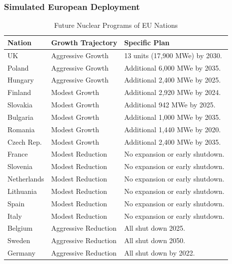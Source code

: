 \begin{frame}
	\frametitle{Simulated European Deployment}
	
\begin{table}[h]
	\centering
	\begin{adjustbox}{max totalsize={1.1\textwidth}{.8\textheight}, center}
				\begin{tabularx}{\textwidth}{lmb}
					\hline 
					
					\textbf{Nation} & \textbf{Growth Trajectory} & \textbf{Specific Plan }\\
					\hline
					UK & Aggressive Growth & {\small  13 units (17,900 MWe) by 2030.}\\
					\hline
					Poland & Aggressive Growth &  {\small Additional 6,000 MWe by 2035.}\\
					\hline
					Hungary & Aggressive Growth &  {\small Additional 2,400 MWe by 2025.} \\ 
					\hline
					Finland & Modest Growth &  {\small Additional 2,920 MWe by 2024.}\\
					\hline
					Slovakia & Modest Growth & {\small Additional 942 MWe by 2025.}\\
					\hline
					Bulgaria & Modest Growth &  {\small Additional 1,000 MWe by 2035.} \\
					\hline
					Romania & Modest Growth &  {\small Additional 1,440 MWe by 2020.} \\
					\hline
					Czech Rep. & Modest Growth & {\small  Additional 2,400 MWe by 2035.}\\
					\hline
					France & Modest Reduction & {\small No expansion or early shutdown.}\\
					\hline
					Slovenia & Modest Reduction & {\small No expansion or early shutdown.}\\
					\hline
					Netherlands & Modest Reduction & {\small No expansion or early shutdown.}\\
					\hline
					Lithuania & Modest Reduction & {\small No expansion or early shutdown.}\\
					\hline 
					Spain & Modest Reduction &  {\small No expansion or early shutdown.} \\
					\hline
					Italy & Modest Reduction & {\small No expansion or early shutdown. }\\
					\hline
					Belgium & Aggressive Reduction & All shut down 2025.\\
					\hline
					Sweden & Aggressive Reduction & All shut down 2050.\\
					\hline
					Germany & Aggressive Reduction & All shut down by 2022.\\
					\hline
					
				\end{tabularx}
	\end{adjustbox}
	\caption {Future Nuclear Programs of \gls{EU} Nations \cite{world_nuclear_association_nuclear_2017}}
  \label{tab:eu_growth}
\end{table}
\end{frame}


